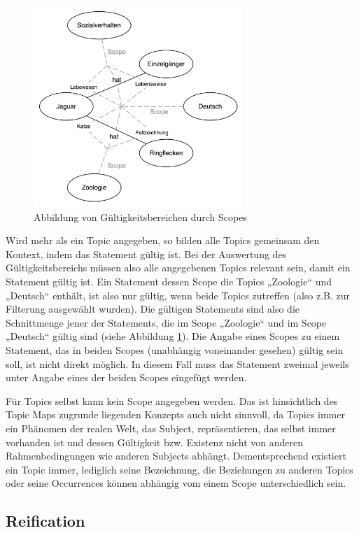 \begin{figure}[htbp]
	\centering
		\includegraphics[height=3in]{img/Persistenz/Scope.png}
	\caption{Abbildung von Gültigkeitsbereichen durch Scopes}
	\label{fig:img_Persistenz_Scope}
\end{figure}


Wird mehr als ein Topic angegeben, so bilden alle Topics gemeinsam den Kontext, indem das Statement gültig ist. Bei der Auswertung des Gültigkeitsbereichs müssen also alle angegebenen Topics relevant sein, damit ein Statement gültig ist. Ein Statement dessen Scope die Topics „Zoologie“ und „Deutsch“ enthält, ist also nur gültig, wenn beide Topics zutreffen (also z.B. zur Filterung ausgewählt wurden). Die gültigen Statements sind also die Schnittmenge jener der Statements, die im Scope „Zoologie“ und im Scope „Deutsch“ gültig sind (siehe Abbildung \ref{fig:img_Persistenz_Scope}). Die Angabe eines Scopes zu einem Statement, das in beiden Scopes (unabhängig voneinander gesehen) gültig sein soll, ist nicht direkt möglich. In diesem Fall muss das Statement zweimal jeweils unter Angabe eines der beiden Scopes eingefügt werden.

Für Topics selbst kann kein Scope angegeben werden. Das ist hinsichtlich des Topic Maps zugrunde liegenden Konzepts auch nicht sinnvoll, da Topics immer ein Phänomen der realen Welt, das Subject, repräsentieren, das selbst immer vorhanden ist und dessen Gültigkeit bzw. Existenz nicht von anderen Rahmenbedingungen wie anderen Subjects abhängt. Dementsprechend existiert ein Topic immer, lediglich seine Bezeichnung, die Beziehungen zu anderen Topics oder seine Occurrences können abhängig vom einem Scope unterschiedlich sein.

\subsection{Reification} %
\label{sub:reification}

